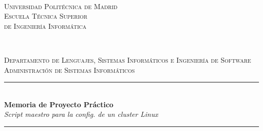 \documentclass[12pt,a4paper, spanish]{article}
\begin{document}
\begin{titlepage}
  \newcommand{\HRule}{\rule{\linewidth}{0.5mm}}
  \centering

   \textsc{}\\[0.25cm]

   \textsc{\huge{Universidad Politécnica de Madrid}}\\[0.5cm]

   \textsc{\LARGE Escuela Técnica Superior\\de Ingeniería Informática}\\[0.3cm]

   \begin{figure}[H]
     \centering
     \qquad
     \\[0.5cm]
   \end{figure}

   \textsc{\Large Departamento de Lenguajes, Sistemas Informáticos e Ingeniería de Software}\\[0.25cm]

   \textsc{\large Administración de Sistemas Informáticos}\\[0.25cm]

   \HRule\\[0.4cm]

   {\huge\textbf{Memoria de Proyecto Práctico}\\[0.4cm] \textit{Script maestro para la config. de un cluster Linux}}\\[0.4cm]
   \HRule\\[1.25cm]


\end{titlepage}
\end{document}
